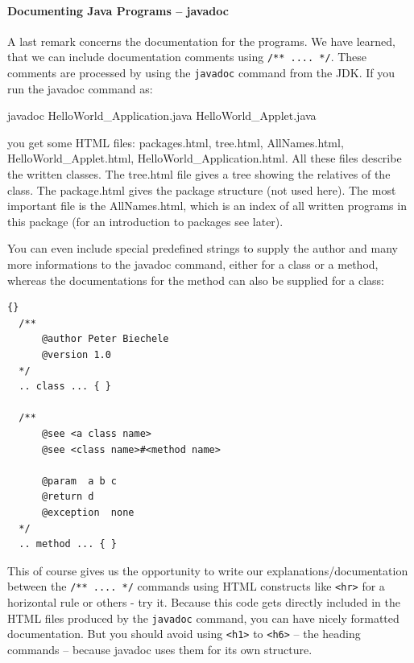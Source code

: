 \paragraph{Documenting Java Programs -- javadoc}
\label{sec:javadoc}
A last remark concerns the documentation for the programs. We have
learned, that we can include documentation comments using 
\verb|/** .... */|. These comments are processed by using the
\verb|javadoc| command from the JDK. If you run the javadoc command as: 
\begin{sverbatim}
  javadoc HelloWorld_Application.java HelloWorld_Applet.java  
\end{sverbatim}
you get some HTML files: packages.html, tree.html, AllNames.html,
HelloWorld\_Applet.html, HelloWorld\_Application.html. All these
files describe the written classes. The tree.html file gives a tree
showing the relatives of the class. The package.html gives the
package structure (not used here). The most important file is the
AllNames.html, which is an index of all written programs in this package
(for an introduction to packages see later).

You can even include special predefined strings to supply the
author and many more informations to the javadoc command, either
for a class or a method, whereas the documentations for the method
can also be supplied for a class:
\begin{lstlisting}{}
  /**
      @author Peter Biechele
      @version 1.0
  */
  .. class ... { }

  /** 
      @see <a class name>
      @see <class name>#<method name>

      @param  a b c
      @return d
      @exception  none
  */
  .. method ... { }
\end{lstlisting}

This of course gives us the opportunity to write our 
explanations/documentation
between the \verb|/** .... */| commands using HTML constructs like
\verb|<hr>| for a horizontal rule or others - try it. 
Because this code gets directly included in the HTML files produced by
the \verb|javadoc| command, you can have nicely formatted documentation.
But you should avoid using \verb|<h1>| to \verb|<h6>| -- the heading 
commands -- because javadoc uses them for its own structure.

